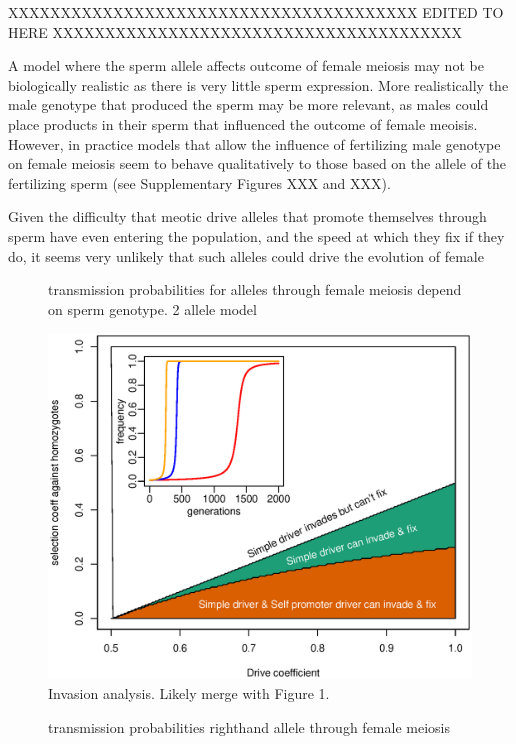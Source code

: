 \documentclass[12pt,letterpaper]{article}
\begin{document}
XXXXXXXXXXXXXXXXXXXXXXXXXXXXXXXXXXXXXXX
EDITED TO HERE
XXXXXXXXXXXXXXXXXXXXXXXXXXXXXXXXXXXXXXX

A model where the sperm allele affects outcome of female meiosis may not be biologically
realistic as there is very little sperm expression. More realistically the male genotype that produced the sperm
may be more relevant, as males could place products in their sperm that influenced the outcome of female meoisis.
However, in practice models that allow the influence of fertilizing male genotype on female meiosis 
seem to behave qualitatively to those based on the allele of the
fertilizing sperm (see Supplementary Figures XXX and XXX).

Given the difficulty that meotic drive alleles that promote themselves
through sperm have even entering the population, and the speed at
which they fix if they do, it seems very unlikely that such alleles
could drive the evolution of female 

\begin{figure}
\caption{transmission probabilities for alleles through female
  meiosis depend on sperm genotype. 2 allele model}  
\label{Eggsperm_2_allele_cartoon}
\end{figure}

\begin{figure}
\includegraphics[width = 0.8 \textwidth]{Figures/invasion_space_recessive_driver.eps}
\caption{Invasion analysis. Likely merge with Figure 1.} \label{Invasion_space}
\end{figure}


\begin{figure}
\caption{transmission probabilities righthand allele through female
  meiosis}  \label{Eggsperm_3_allele_cartoon}
\end{figure}
\end{document}
